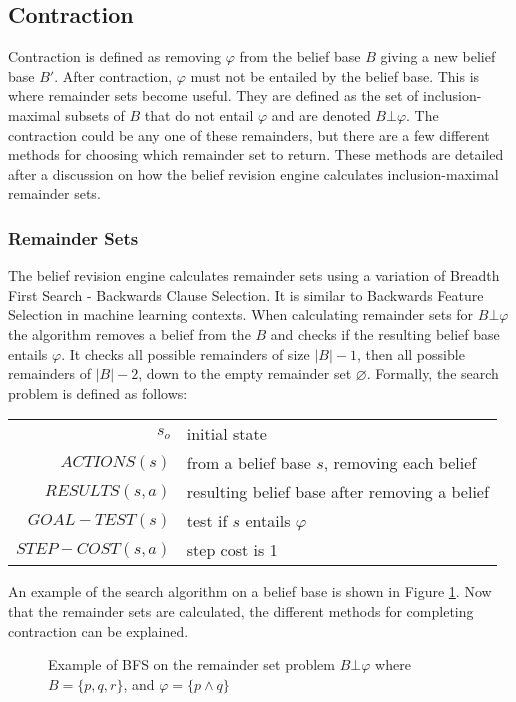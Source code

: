 \documentclass[a4paper,10pt]{article}
\newcommand{\norm}[1]{\lvert #1 \rvert}
\begin{document}
\subsection{Contraction}
\label{subsec:contraction}
Contraction is defined as removing $\varphi$ from the belief base $B$ giving a new belief base $B'$. After contraction, $\varphi$ must not be entailed by the belief base. This is where remainder sets become useful. They are defined as the set of inclusion-maximal subsets of $B$ that do not entail $\varphi$ and are denoted $B \bot\varphi$. The contraction could be any one of these remainders, but there are a few different methods for choosing which remainder set to return. These methods are detailed after a discussion on how the belief revision engine calculates inclusion-maximal remainder sets.

\subsubsection{Remainder Sets}
\label{subsubsec:remainders}
The belief revision engine calculates remainder sets using a variation of Breadth First Search - Backwards Clause Selection. It is similar to Backwards Feature Selection in machine learning contexts. When calculating remainder sets for $B \bot\varphi$ the algorithm removes a belief from the $B$ and checks if the resulting belief base entails $\varphi$. It checks all possible remainders of size $\norm{B}-1$, then all possible remainders of $\norm{B}-2$, down to the empty remainder set $\varnothing$. Formally, the search problem is defined as follows:
\begin{table}[!htb]
\centering
\begin{tabular}{rl}
$s_o$ & initial state \\
$ACTIONS(s)$ & from a belief base $s$, removing each belief \\
$RESULTS(s, a)$ & resulting belief base after removing a belief \\
$GOAL-TEST(s)$ & test if $s$ entails $\varphi$ \\
$STEP-COST(s,a)$ & step cost is 1 \\
\end{tabular}
\end{table}

An example of the search algorithm on a belief base is shown in Figure \ref{fig:BFS}. Now that the remainder sets are calculated, the different methods for completing contraction can be explained.
\begin{figure}[!htb]
\centering
\caption{Example of BFS on the remainder set problem $B \bot\varphi$ where $B = \{p,q,r\}$, and $\varphi = \{p \wedge q\}$}
\label{fig:BFS}
\end{figure}
\end{document}
